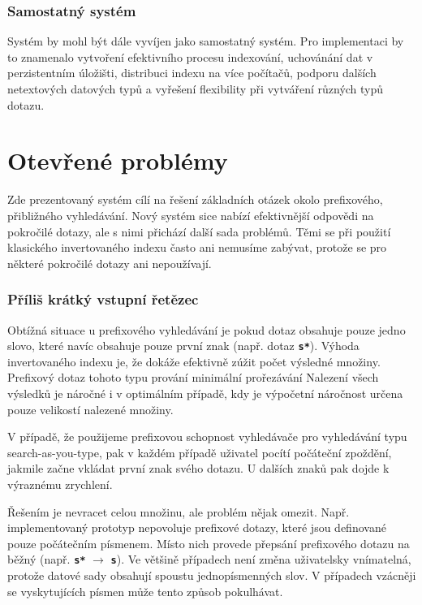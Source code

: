 \documentclass[11pt,letterpaper,oneside,openright]{book}
\newcommand{\bftt}[1]{\texttt{\textbf{#1}}}
\begin{document}
\subsubsection{Samostatný systém}
Systém by mohl být dále vyvíjen jako samostatný systém. Pro implementaci by to
znamenalo vytvoření efektivního procesu indexování, uchovánání dat v
perzistentním úložišti, distribuci indexu na více počítačů, podporu dalších
netextových datových typů a vyřešení flexibility při vytváření různých typů
dotazu.

\section{Otevřené problémy}
Zde prezentovaný systém cílí na řešení základních otázek okolo prefixového,
přibližného vyhledávání. Nový systém sice nabízí efektivnější odpovědi na
pokročilé dotazy, ale s nimi přichází další sada problémů. Těmi se při použití
klasického invertovaného indexu často ani nemusíme zabývat, protože se pro
některé pokročilé dotazy ani nepoužívají.

\subsubsection{Příliš krátký vstupní řetězec}
Obtížná situace u prefixového vyhledávání je pokud dotaz obsahuje pouze jedno
slovo, které navíc obsahuje pouze první znak (např. dotaz \bftt{s*}). Výhoda
invertovaného indexu je, že dokáže efektivně zúžit počet výsledné množiny.
Prefixový dotaz tohoto typu prování minimální prořezávání Nalezení všech
výsledků je náročné i v optimálním případě, kdy je výpočetní náročnost určena
pouze velikostí nalezené množiny. 

V případě, že použijeme prefixovou schopnost vyhledávače pro vyhledávání typu
search-as-you-type, pak v každém případě uživatel pocítí počáteční zpoždění,
jakmile začne vkládat první znak svého dotazu. U dalších znaků pak dojde k
výraznému zrychlení.

Řešením je nevracet celou množinu, ale problém nějak omezit. Např.
implementovaný prototyp nepovoluje prefixové dotazy, které jsou definované
pouze počátečním písmenem. Místo nich provede přepsání prefixového dotazu na
běžný (např. \bftt{s*} $\rightarrow$ \bftt{s}). Ve většině případech není změna
uživatelsky vnímatelná, protože datové sady obsahují spoustu jednopísmenných
slov. V případech vzácněji se vyskytujících písmen může tento způsob
pokulhávat.
\end{document}
